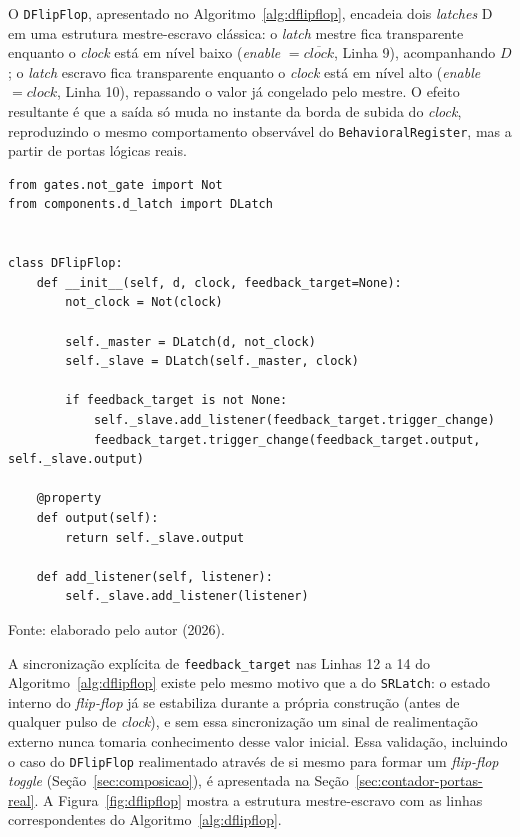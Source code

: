 O \texttt{DFlipFlop}, apresentado no Algoritmo~\ref{alg:dflipflop}, encadeia dois \textit{latches} D em uma estrutura mestre-escravo clássica: o \textit{latch} mestre fica transparente enquanto o \textit{clock} está em nível baixo (\textit{enable} $= \overline{\mathit{clock}}$, Linha 9), acompanhando $D$; o \textit{latch} escravo fica transparente enquanto o \textit{clock} está em nível alto (\textit{enable} $= \mathit{clock}$, Linha 10), repassando o valor já congelado pelo mestre. O efeito resultante é que a saída só muda no instante da borda de subida do \textit{clock}, reproduzindo o mesmo comportamento observável do \texttt{BehavioralRegister}, mas a partir de portas lógicas reais.

\begin{algoritmo}[H]
\caption{DFlipFlop (components/d\_flip\_flop.py).}
\label{alg:dflipflop}
\begin{verbatim}
from gates.not_gate import Not
from components.d_latch import DLatch


class DFlipFlop:
    def __init__(self, d, clock, feedback_target=None):
        not_clock = Not(clock)

        self._master = DLatch(d, not_clock)
        self._slave = DLatch(self._master, clock)

        if feedback_target is not None:
            self._slave.add_listener(feedback_target.trigger_change)
            feedback_target.trigger_change(feedback_target.output, self._slave.output)

    @property
    def output(self):
        return self._slave.output

    def add_listener(self, listener):
        self._slave.add_listener(listener)
\end{verbatim}
\begin{center}
\footnotesize Fonte: elaborado pelo autor (2026).
\end{center}
\end{algoritmo}

A sincronização explícita de \texttt{feedback\_target} nas Linhas 12 a 14 do Algoritmo~\ref{alg:dflipflop} existe pelo mesmo motivo que a do \texttt{SRLatch}: o estado interno do \textit{flip-flop} já se estabiliza durante a própria construção (antes de qualquer pulso de \textit{clock}), e sem essa sincronização um sinal de realimentação externo nunca tomaria conhecimento desse valor inicial. Essa validação, incluindo o caso do \texttt{DFlipFlop} realimentado através de si mesmo para formar um \textit{flip-flop} \textit{toggle} (Seção~\ref{sec:composicao}), é apresentada na Seção~\ref{sec:contador-portas-real}. A Figura~\ref{fig:dflipflop} mostra a estrutura mestre-escravo com as linhas correspondentes do Algoritmo~\ref{alg:dflipflop}.

